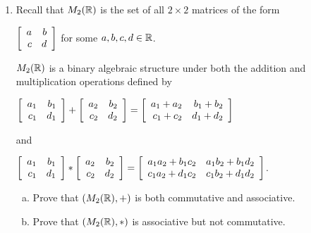 \documentclass[11pt,fleqn,dvipsnames,usenames]{article}
\begin{document}
\begin{enumerate}[1.]
\item Recall that $M_{2}(\R)$ is the set of all $2\times 2$ matrices of the form
\begin{center}
$\MATRIX{rr}{a & b\\c& d}$ for some $a,b,c,d\in\R$.
\end{center}
$M_{2}(\R)$ is a binary algebraic structure under both the addition and multiplication operations defined by
\begin{center}
$\MATRIX{rr}{a_{1} & b_{1}\\c_{1} & d_{1}} + \MATRIX{rr}{a_{2} & b_{2}\\c_{2} & d_{2}} = \MATRIX{rr}{a_{1} + a_{2} & b_{1} + b_{2}\\c_{1} + c_{2} & d_{1} + d_{2}}$ 
\end{center}
and 
\begin{center}
$\MATRIX{rr}{a_{1} & b_{1}\\c_{1} & d_{1}} * \MATRIX{rr}{a_{2} & b_{2}\\c_{2} & d_{2}} = \MATRIX{rr}{a_{1}a_{2} + b_{1}c_{2} & a_{1}b_{2} + b_{1}d_{2}\\c_{1}a_{2} + d_{1}c_{2} & c_{1}b_{2} + d_{1}d_{2}}$.
\end{center}
\begin{enumerate}[(a)]
\item Prove that $(M_{2}(\R), +)$ is both commutative and associative.
\item Prove that $(M_{2}(\R), *)$ is associative but not commutative.
\end{enumerate}
\end{enumerate}
\vsp
\end{document}

